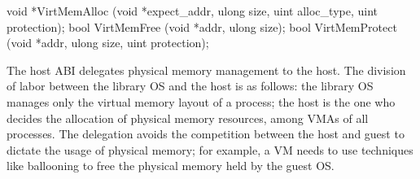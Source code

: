 \begin{paldef}
void *VirtMemAlloc   (void *expect_addr, ulong size,
                      uint alloc_type, uint protection);
bool  VirtMemFree    (void *addr, ulong size);
bool  VirtMemProtect (void *addr, ulong size,
                      uint protection);
\end{paldef}


The host ABI delegates physical memory management to the host. The division of labor between the library OS and the host is as follows:
the library OS manages only the virtual memory layout of a process;
the host is the one who decides the allocation of physical memory resources, among VMAs of all processes.
The delegation avoids the competition between the host and guest
to dictate the usage of physical memory;
for example, a VM needs to use techniques like ballooning to free the physical memory held by the guest OS.







